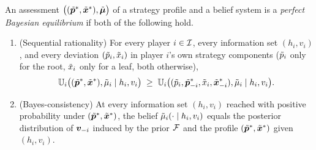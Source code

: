 \begin{definition}
\label{def:pbe}
An assessment $\big((\tilde{{\bm{p}}}^*, \tilde{{\bm{x}}}^*), {\tilde{{\bm{\mu}}}}\big)$ of a strategy profile and a belief system is a \emph{perfect Bayesian equilibrium} if both of the following hold.
\begin{enumerate}[label=(\alph*),left=0em]
\item \textup{(Sequential rationality)} For every player $i \in \mathcal{I}$, every information set $(h_i, v_i)$, and every deviation $(\tilde{p}_i, \tilde{x}_i)$ in player $i$'s own strategy components ($\tilde{p}_i$ only for the root, $\tilde{x}_i$ only for a leaf, both otherwise),
\[
\mathbb{U}_i\big((\tilde{{\bm{p}}}^*, \tilde{{\bm{x}}}^*), {\tilde{\mu}}_i \mid h_i, v_i\big) \;\ge\; \mathbb{U}_i\big((\tilde{p}_i, \tilde{{\bm{p}}}^*_{-i}, \tilde{x}_i, \tilde{{\bm{x}}}^*_{-i}), {\tilde{\mu}}_i \mid h_i, v_i\big).
\]
\item \textup{(Bayes-consistency)} At every information set $(h_i, v_i)$ reached with positive probability under $(\tilde{{\bm{p}}}^*, \tilde{{\bm{x}}}^*)$, the belief ${\tilde{\mu}}_i(\cdot \mid h_i, v_i)$ equals the posterior distribution of ${\bm{v}}_{-i}$ induced by the prior $\mathcal{F}$ and the profile $(\tilde{{\bm{p}}}^*, \tilde{{\bm{x}}}^*)$ given $(h_i, v_i)$.
\end{enumerate}
\end{definition}


